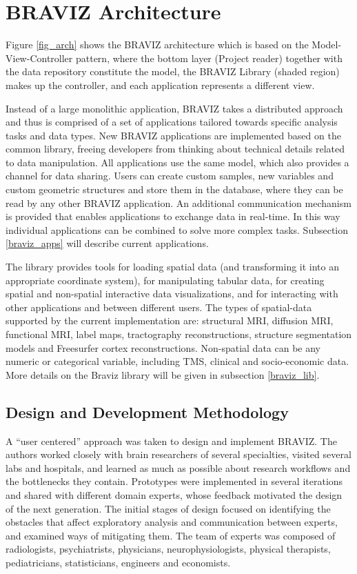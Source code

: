 \documentclass{frontiersHLTH}
\begin{document}
\section{BRAVIZ Architecture}

Figure \ref{fig_arch} shows the BRAVIZ architecture which is based on the Model-View-Controller pattern, where the bottom layer (Project reader) together with the data repository constitute the model, the  BRAVIZ Library (shaded region) makes up the controller, and each application represents a different view.

Instead of a large monolithic application, BRAVIZ takes a distributed approach and thus is comprised of a set of applications tailored towards specific analysis tasks and data types. 
New BRAVIZ applications are implemented based on the common library, freeing developers from thinking about technical details related to data manipulation. All applications use the same  model, which also provides a channel for data sharing. Users can create custom samples, new variables and custom geometric structures and store them in the database, where they can be read by any other BRAVIZ application. An additional communication mechanism is provided that enables applications to exchange data in real-time. In this way individual applications can be combined to solve more complex tasks. Subsection \ref{braviz_apps} will describe current applications.

The library provides tools for loading spatial data (and transforming it into an appropriate coordinate system), for manipulating tabular data, for creating spatial and non-spatial interactive data visualizations, and for interacting with other applications and between different users. The types of spatial-data supported by the current implementation are: structural MRI, diffusion MRI, functional MRI, label maps, tractography reconstructions, structure segmentation models and Freesurfer cortex reconstructions. Non-spatial data can be any numeric or categorical variable, including TMS, clinical and socio-economic data. More details on the Braviz library will be given in subsection \ref{braviz_lib}. 

\subsection{Design and Development Methodology}

A ``user centered'' approach \cite{wassink_applying_2009} was taken to design and implement BRAVIZ. The authors worked closely with brain researchers of several specialties, visited several labs and hospitals, and learned as much as possible about research workflows and the bottlenecks they contain. Prototypes were implemented in several iterations and shared with different domain experts, whose feedback motivated the design of the next generation.
The initial stages of design focused on identifying the obstacles that affect exploratory analysis and communication between experts, and examined ways of mitigating them. The team of experts was composed of radiologists, psychiatrists, physicians, neurophysiologists, physical therapists, pediatricians, statisticians, engineers and economists.
\end{document}
